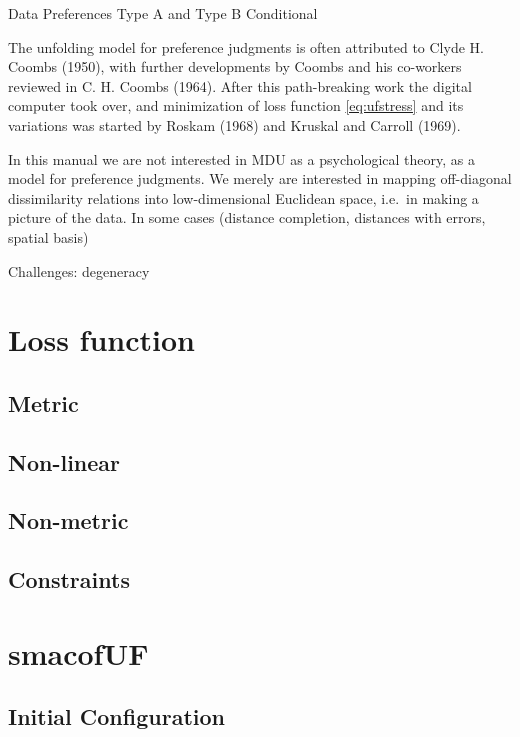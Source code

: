 \documentclass[
  12pt,
]{article}
\begin{document}
Data Preferences Type A and Type B Conditional

The unfolding model for preference judgments is often attributed to Clyde H. Coombs (1950),
with further developments by Coombs and his co-workers reviewed in C. H. Coombs (1964).
After this path-breaking work the digital computer took over, and minimization of loss function
\eqref{eq:ufstress} and its variations was started by
Roskam (1968) and Kruskal and Carroll (1969).

In this manual we are not interested in MDU as a psychological theory, as a model for
preference judgments. We merely are interested in mapping off-diagonal dissimilarity
relations into low-dimensional Euclidean space, i.e.~in making a picture of the
data. In some cases (distance completion, distances with errors, spatial basis)

Challenges: degeneracy

\section{Loss function}\label{loss-function}

\subsection{Metric}\label{metric}

\subsection{Non-linear}\label{non-linear}

\subsection{Non-metric}\label{non-metric}

\subsection{Constraints}\label{constraints}

\section{smacofUF}\label{smacofuf}

\subsection{Initial Configuration}\label{initial-configuration}
\end{document}
